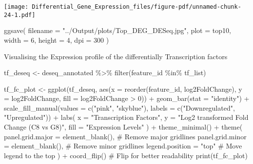\documentclass[
  letterpaper,
  DIV=11,
  numbers=noendperiod]{scrartcl}
\newenvironment{Shaded}{\begin{snugshade}}{\end{snugshade}}
\newcommand{\AttributeTok}[1]{\textcolor[rgb]{0.40,0.45,0.13}{#1}}
\newcommand{\CommentTok}[1]{\textcolor[rgb]{0.37,0.37,0.37}{#1}}
\newcommand{\DecValTok}[1]{\textcolor[rgb]{0.68,0.00,0.00}{#1}}
\newcommand{\FunctionTok}[1]{\textcolor[rgb]{0.28,0.35,0.67}{#1}}
\newcommand{\NormalTok}[1]{\textcolor[rgb]{0.00,0.23,0.31}{#1}}
\newcommand{\OtherTok}[1]{\textcolor[rgb]{0.00,0.23,0.31}{#1}}
\newcommand{\SpecialCharTok}[1]{\textcolor[rgb]{0.37,0.37,0.37}{#1}}
\newcommand{\StringTok}[1]{\textcolor[rgb]{0.13,0.47,0.30}{#1}}
\begin{document}
\texttt{[image: Differential\_Gene\_Expression\_files/figure-pdf/unnamed-chunk-24-1.pdf]}

\begin{Shaded}
\begin{Highlighting}[]
\FunctionTok{ggsave}\NormalTok{(}
  \AttributeTok{filename =} \StringTok{"../Output/plots/Top\_DEG\_DESeq.jpg"}\NormalTok{,   }
  \AttributeTok{plot =}\NormalTok{ top10,                      }
  \AttributeTok{width =} \DecValTok{6}\NormalTok{, }\AttributeTok{height =} \DecValTok{4}\NormalTok{,               }
  \AttributeTok{dpi =} \DecValTok{300}                            
\NormalTok{)}
\end{Highlighting}
\end{Shaded}

Visualising the Expression profile of the differentially Transcription
factors

\begin{Shaded}
\begin{Highlighting}[]
\NormalTok{tf\_deseq }\OtherTok{\textless{}{-}}\NormalTok{ deseq\_annotated }\SpecialCharTok{\%\textgreater{}\%} \FunctionTok{filter}\NormalTok{(feature\_id }\SpecialCharTok{\%in\%}\NormalTok{ tf\_list)}

\NormalTok{tf\_fc\_plot }\OtherTok{\textless{}{-}} \FunctionTok{ggplot}\NormalTok{(tf\_deseq, }\FunctionTok{aes}\NormalTok{(}\AttributeTok{x =} \FunctionTok{reorder}\NormalTok{(feature\_id, log2FoldChange), }
                   \AttributeTok{y =}\NormalTok{ log2FoldChange, }
                   \AttributeTok{fill =}\NormalTok{ log2FoldChange }\SpecialCharTok{\textgreater{}} \DecValTok{0}\NormalTok{)) }\SpecialCharTok{+}
  \FunctionTok{geom\_bar}\NormalTok{(}\AttributeTok{stat =} \StringTok{"identity"}\NormalTok{) }\SpecialCharTok{+}
  \FunctionTok{scale\_fill\_manual}\NormalTok{(}\AttributeTok{values =} \FunctionTok{c}\NormalTok{(}\StringTok{"pink"}\NormalTok{, }\StringTok{"skyblue"}\NormalTok{), }
                    \AttributeTok{labels =} \FunctionTok{c}\NormalTok{(}\StringTok{"Downregulated"}\NormalTok{, }\StringTok{"Upregulated"}\NormalTok{)) }\SpecialCharTok{+}
  \FunctionTok{labs}\NormalTok{(}
    \AttributeTok{x =} \StringTok{"Transcription Factors"}\NormalTok{, }
    \AttributeTok{y =} \StringTok{"Log2 transformed Fold Change (C8 vs G8)"}\NormalTok{, }
    \AttributeTok{fill =} \StringTok{"Expression Levels"}
\NormalTok{  ) }\SpecialCharTok{+}
  \FunctionTok{theme\_minimal}\NormalTok{() }\SpecialCharTok{+}
  \FunctionTok{theme}\NormalTok{(}
    \AttributeTok{panel.grid.major =} \FunctionTok{element\_blank}\NormalTok{(), }\CommentTok{\# Remove major gridlines}
    \AttributeTok{panel.grid.minor =} \FunctionTok{element\_blank}\NormalTok{(), }\CommentTok{\# Remove minor gridlines}
    \AttributeTok{legend.position =} \StringTok{"top"} \CommentTok{\# Move legend to the top}
\NormalTok{  ) }\SpecialCharTok{+}
  \FunctionTok{coord\_flip}\NormalTok{()  }\CommentTok{\# Flip for better readability}
\FunctionTok{print}\NormalTok{(tf\_fc\_plot)}
\end{Highlighting}
\end{Shaded}
\end{document}
